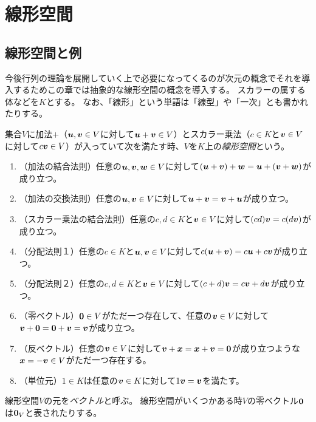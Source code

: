 
\chapter{線形空間}

\section{線形空間と例}

今後行列の理論を展開していく上で必要になってくるのが次元の概念でそれを導入するためこの章では抽象的な線形空間の概念を導入する。
スカラーの属する体などを$K$とする。
なお、「線形」という単語は「線型」や「一次」とも書かれたりする。

\begin{definition}[線形空間]
集合$V$に加法$+$（$\vb*{u}, \vb*{v} \in V$に対して$\vb*{u}+\vb*{v} \in V$）とスカラー乗法（$c \in K$と$\vb*{v} \in V$に対して$c\vb*{v} \in V$）が入っていて次を満たす時、$V$を$K$上の\emph{線形空間}という。
\begin{enumerate}
\item
（加法の結合法則）任意の$\vb*{u}, \vb*{v}, \vb*{w} \in V$に対して$(\vb*{u}+\vb*{v})+\vb*{w} = \vb*{u}+(\vb*{v}+\vb*{w})$が成り立つ。
\item
（加法の交換法則）任意の$\vb*{u}, \vb*{v} \in V$に対して$\vb*{u}+\vb*{v} = \vb*{v}+\vb*{u}$が成り立つ。
\item
（スカラー乗法の結合法則）任意の$c, d \in K$と$\vb*{v} \in V$に対して$(c d)\vb*{v} = c(d\vb*{v})$が成り立つ。
\item
（分配法則１）任意の$c \in K$と$\vb*{u}, \vb*{v} \in V$に対して$c(\vb*{u}+\vb*{v}) = c\vb*{u}+c\vb*{v}$が成り立つ。
\item
（分配法則２）任意の$c, d \in K$と$\vb*{v} \in V$に対して$(c+d)\vb*{v} = c\vb*{v}+d\vb*{v}$が成り立つ。
\item
（零ベクトル）$\vb*{0} \in V$がただ一つ存在して、任意の$\vb*{v} \in V$に対して$\vb*{v}+\vb*{0} = \vb*{0}+\vb*{v} = \vb*{v}$が成り立つ。
\item
（反ベクトル）任意の$\vb*{v} \in V$に対して$\vb*{v}+\vb*{x} = \vb*{x}+\vb*{v} = \vb*{0}$が成り立つような$\vb*{x} = -\vb*{v} \in V$がただ一つ存在する。
\item
（単位元）$1 \in K$は任意の$\vb*{v} \in K$に対して$1\vb*{v} = \vb*{v}$を満たす。
\end{enumerate}
線形空間$V$の元を\emph{ベクトル}と呼ぶ。
線形空間がいくつかある時$V$の零ベクトル$\vb*{0}$は$\vb*{0}_V$と表されたりする。
\end{definition}

